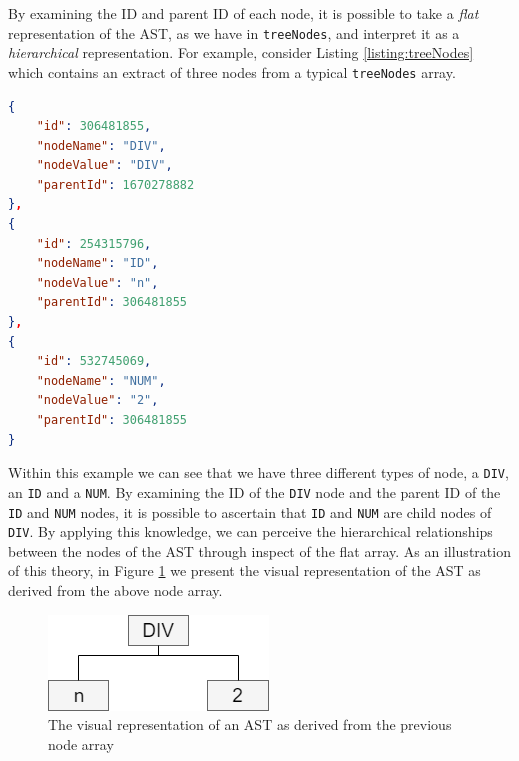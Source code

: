 \documentclass{l4proj}
\begin{document}
By examining the ID and parent ID of each node, it is possible to take a \textit{flat} representation of the AST, as we have in \texttt{treeNodes}, and interpret it as a \textit{hierarchical} representation. For example, consider Listing \ref{listing:treeNodes} which contains an extract of three nodes from a typical \texttt{treeNodes} array.
\begin{lstlisting}[language=json, caption=Extract from the \texttt{treeNodes} array, label=listing:treeNodes]
{
	"id": 306481855,
	"nodeName": "DIV",
	"nodeValue": "DIV",
	"parentId": 1670278882
},
{
	"id": 254315796,
	"nodeName": "ID",
	"nodeValue": "n",
	"parentId": 306481855
},
{
	"id": 532745069,
	"nodeName": "NUM",
	"nodeValue": "2",
	"parentId": 306481855
}
\end{lstlisting}
Within this example we can see that we have three different types of node, a \texttt{DIV}, an \texttt{ID} and a \texttt{NUM}. By examining the ID of the \texttt{DIV} node and the parent ID of the \texttt{ID} and \texttt{NUM} nodes, it is possible to ascertain that \texttt{ID} and \texttt{NUM} are child nodes of \texttt{DIV}. By applying this knowledge, we can perceive the hierarchical relationships between the nodes of the AST through inspect of the flat array. As an illustration of this theory, in Figure \ref{fig:treeNodes} we present the visual representation of the AST as derived from the above node array.
\begin{figure}[h]
\centering
\includegraphics[scale=0.6]{images/treeNodes.png}
\caption{The visual representation of an AST as derived from the previous node array}
\label{fig:treeNodes}	
\end{figure}
\end{document}
